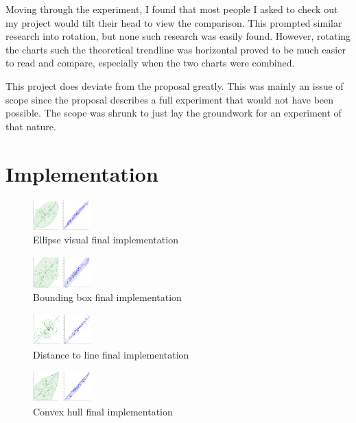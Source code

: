 \documentclass{proc}
\begin{document}
		Moving through the experiment, I found that most people I asked to check out my project would tilt their head to view the comparison. This prompted similar research into rotation, but none such research was easily found. However, rotating the charts such the theoretical trendline was horizontal proved to be much easier to read and compare, especially when the two charts were combined. 
		
		This project does deviate from the proposal greatly. This was mainly an issue of scope since the proposal describes a full experiment that would not have been possible. The scope was shrunk to just lay the groundwork for an experiment of that nature. 
	\section{Implementation}
		\begin{figure}[t]
			\centering
			\includegraphics[width=0.2\textwidth]{ellipse-final}
			\caption{Ellipse visual final implementation}
			\label{fig:ellipse-final}
		\end{figure}
		\begin{figure}[t]
			\centering
			\includegraphics[width=0.2\textwidth]{bounding-final}
			\caption{Bounding box final implementation}
			\label{fig:bounding-final}
		\end{figure}
		\begin{figure}[t]
			\centering
			\includegraphics[width=0.2\textwidth]{distance-final}
			\caption{Distance to line final implementation}
			\label{fig:distance-final}
		\end{figure}
		\begin{figure}[t]
			\centering
			\includegraphics[width=0.2\textwidth]{convex-final}
			\caption{Convex hull final implementation}
			\label{fig:convex-final}
		\end{figure}
		
\end{document}
